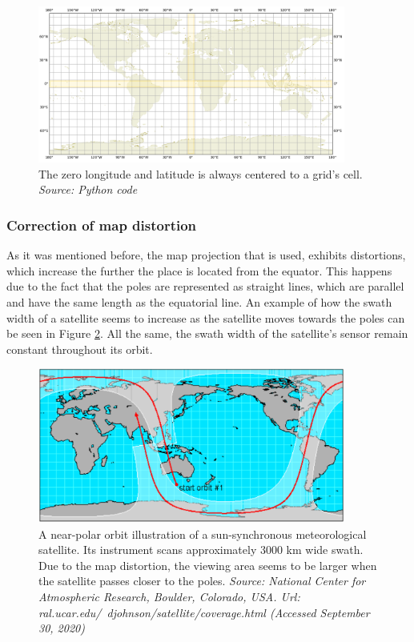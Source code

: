 \begin{figure}
\centering
\includegraphics[width=0.9\textwidth]{Images/map_projection_0covered.png}\caption{The zero longitude and latitude is always centered to a grid's cell. \textit{Source: Python code}}
\label{map_projection_0covered}
\end{figure}

\bigskip
\subsubsection{Correction of map distortion}
\label{Correction of map distortion}
\bigskip

As it was mentioned before, the map projection that is used, exhibits distortions, which increase the further the place is located from the equator. This happens due to the fact that the poles are represented as straight lines, which are parallel and have the same length as the equatorial line. An example of how the swath width of a satellite seems to increase as the satellite moves towards the poles can be seen in Figure \ref{distortion_show-swath-width}. All the same, the swath width of the satellite's sensor remain constant throughout its orbit.

\begin{figure}
\centering
\includegraphics[width=0.9\textwidth]{Images/distortion_show-swath-width.png}\caption{A near-polar orbit illustration of a sun-synchronous meteorological satellite. Its instrument scans approximately 3000 km wide swath. Due to the map distortion, the viewing area seems to be larger when the satellite passes closer to the poles. \textit{Source: National Center for Atmospheric Research, Boulder, Colorado, USA. Url: ral.ucar.edu/~djohnson/satellite/coverage.html (Accessed September 30, 2020)}}
\label{distortion_show-swath-width}
\end{figure}


